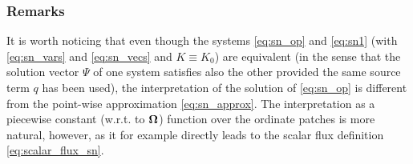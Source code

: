 \subsubsection{Remarks}\label{sec:remarks}
It is worth noticing that even though the systems \eqref{eq:sn_op}
and \eqref{eq:sn1} (with \eqref{eq:sn_vars} and \eqref{eq:sn_vecs} and $K \equiv K_0$) are equivalent (in the sense that
the solution vector $\Psi$ of one system satisfies also the other provided the same source term $q$ has been used), the
interpretation of the solution of \eqref{eq:sn_op} is different from the point-wise approximation \eqref{eq:sn_approx}. The interpretation as a piecewise constant (w.r.t. to $\mathbf{\Omega}$) function over the ordinate patches is more natural, however, as it for example directly leads to the scalar flux definition \eqref{eq:scalar_flux_sn}.

